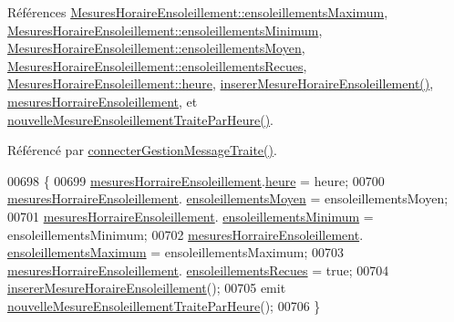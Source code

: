 Références \hyperlink{struct_mesures_horaire_ensoleillement_adc848a942c5dcb0984b4c346f07e6f09}{Mesures\+Horaire\+Ensoleillement\+::ensoleillements\+Maximum}, \hyperlink{struct_mesures_horaire_ensoleillement_a5d1165f40806663a3fd40ee4408c78f1}{Mesures\+Horaire\+Ensoleillement\+::ensoleillements\+Minimum}, \hyperlink{struct_mesures_horaire_ensoleillement_a41c11dd16f5e42cf8b4882f98b9cee49}{Mesures\+Horaire\+Ensoleillement\+::ensoleillements\+Moyen}, \hyperlink{struct_mesures_horaire_ensoleillement_a78d40966edb1ace93776ba33edfc5151}{Mesures\+Horaire\+Ensoleillement\+::ensoleillements\+Recues}, \hyperlink{struct_mesures_horaire_ensoleillement_a478cf936fa746f384445cf5077206454}{Mesures\+Horaire\+Ensoleillement\+::heure}, \hyperlink{class_ruche_a658234b9d96541d204b95b74556742b6}{inserer\+Mesure\+Horaire\+Ensoleillement()}, \hyperlink{class_ruche_a5e57df1ce7805b1ab0f6d8ef37504582}{mesures\+Horraire\+Ensoleillement}, et \hyperlink{class_ruche_adab3ce6ee33b3e6306aa7dc4f2ca1f20}{nouvelle\+Mesure\+Ensoleillement\+Traite\+Par\+Heure()}.



Référencé par \hyperlink{class_ruche_a20ec8c6dc931218e5cf682050fe845d9}{connecter\+Gestion\+Message\+Traite()}.


\begin{DoxyCode}
00698 \{
00699     \hyperlink{class_ruche_a5e57df1ce7805b1ab0f6d8ef37504582}{mesuresHorraireEnsoleillement}.\hyperlink{struct_mesures_horaire_ensoleillement_a478cf936fa746f384445cf5077206454}{heure} = heure;
00700     \hyperlink{class_ruche_a5e57df1ce7805b1ab0f6d8ef37504582}{mesuresHorraireEnsoleillement}.
      \hyperlink{struct_mesures_horaire_ensoleillement_a41c11dd16f5e42cf8b4882f98b9cee49}{ensoleillementsMoyen} = ensoleillementsMoyen;
00701     \hyperlink{class_ruche_a5e57df1ce7805b1ab0f6d8ef37504582}{mesuresHorraireEnsoleillement}.
      \hyperlink{struct_mesures_horaire_ensoleillement_a5d1165f40806663a3fd40ee4408c78f1}{ensoleillementsMinimum} = ensoleillementsMinimum;
00702     \hyperlink{class_ruche_a5e57df1ce7805b1ab0f6d8ef37504582}{mesuresHorraireEnsoleillement}.
      \hyperlink{struct_mesures_horaire_ensoleillement_adc848a942c5dcb0984b4c346f07e6f09}{ensoleillementsMaximum} = ensoleillementsMaximum;
00703     \hyperlink{class_ruche_a5e57df1ce7805b1ab0f6d8ef37504582}{mesuresHorraireEnsoleillement}.
      \hyperlink{struct_mesures_horaire_ensoleillement_a78d40966edb1ace93776ba33edfc5151}{ensoleillementsRecues} = \textcolor{keyword}{true};
00704     \hyperlink{class_ruche_a658234b9d96541d204b95b74556742b6}{insererMesureHoraireEnsoleillement}();
00705     emit \hyperlink{class_ruche_adab3ce6ee33b3e6306aa7dc4f2ca1f20}{nouvelleMesureEnsoleillementTraiteParHeure}();
00706 \}
\end{DoxyCode}
\mbox{\label{class_ruche_a59e89246b484d7b63851c0ebd20af6c5}} 
